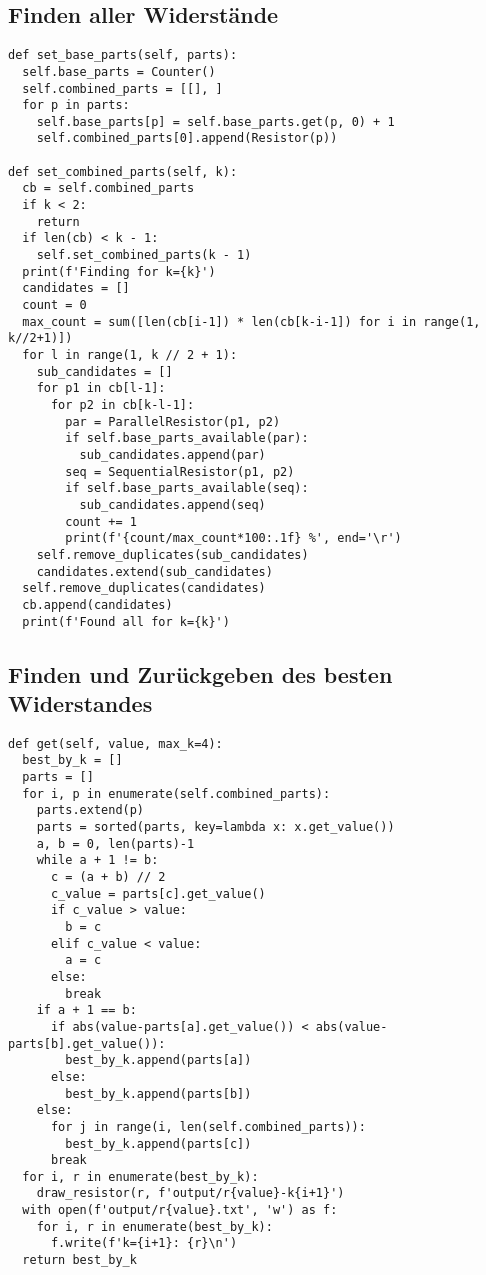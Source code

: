 \documentclass[a4paper,10pt,ngerman]{scrartcl}
\begin{document}
\subsection{Finden aller Widerst\"ande}
\begin{lstlisting}[frame=single]
def set_base_parts(self, parts):
  self.base_parts = Counter()
  self.combined_parts = [[], ]
  for p in parts:                                       
    self.base_parts[p] = self.base_parts.get(p, 0) + 1  
    self.combined_parts[0].append(Resistor(p))

def set_combined_parts(self, k):
  cb = self.combined_parts
  if k < 2: 
    return
  if len(cb) < k - 1:
    self.set_combined_parts(k - 1)
  print(f'Finding for k={k}')
  candidates = []
  count = 0
  max_count = sum([len(cb[i-1]) * len(cb[k-i-1]) for i in range(1, k//2+1)])
  for l in range(1, k // 2 + 1):
    sub_candidates = []
    for p1 in cb[l-1]:    
      for p2 in cb[k-l-1]:
        par = ParallelResistor(p1, p2)
        if self.base_parts_available(par):
          sub_candidates.append(par)
        seq = SequentialResistor(p1, p2)
        if self.base_parts_available(seq):
          sub_candidates.append(seq)
        count += 1
        print(f'{count/max_count*100:.1f} %', end='\r')
    self.remove_duplicates(sub_candidates)
    candidates.extend(sub_candidates)
  self.remove_duplicates(candidates)
  cb.append(candidates)
  print(f'Found all for k={k}')
\end{lstlisting}
\subsection{Finden und Zur\"uckgeben des besten Widerstandes}
\begin{lstlisting}[frame=single]
def get(self, value, max_k=4):
  best_by_k = []
  parts = []
  for i, p in enumerate(self.combined_parts):
    parts.extend(p)
    parts = sorted(parts, key=lambda x: x.get_value())
    a, b = 0, len(parts)-1
    while a + 1 != b:
      c = (a + b) // 2
      c_value = parts[c].get_value()
      if c_value > value:
        b = c
      elif c_value < value:
        a = c
      else:
        break
    if a + 1 == b:
      if abs(value-parts[a].get_value()) < abs(value-parts[b].get_value()):
        best_by_k.append(parts[a])
      else:
        best_by_k.append(parts[b])
    else:
      for j in range(i, len(self.combined_parts)):
        best_by_k.append(parts[c])
      break
  for i, r in enumerate(best_by_k):
    draw_resistor(r, f'output/r{value}-k{i+1}')
  with open(f'output/r{value}.txt', 'w') as f:
    for i, r in enumerate(best_by_k):
      f.write(f'k={i+1}: {r}\n')
  return best_by_k
\end{lstlisting}
\end{document}

